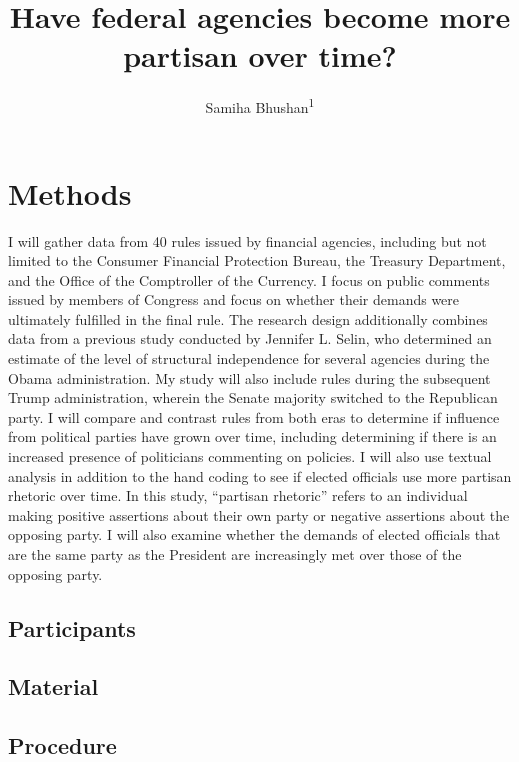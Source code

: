 \documentclass[
  english,
  man]{apa6}
\title{Have federal agencies become more partisan over time?}
\author{Samiha Bhushan\textsuperscript{1}}
\date{}
\affiliation{\vspace{0.5cm}\textsuperscript{1} University of Wisconsin-Madison}
\begin{document}
\maketitle

\hypertarget{methods}{%
\section{Methods}\label{methods}}

I will gather data from 40 rules issued by financial agencies, including but not limited
to the Consumer Financial Protection Bureau, the Treasury Department, and the Office of
the Comptroller of the Currency. I focus on public comments issued by members of
Congress and focus on whether their demands were ultimately fulfilled in the final rule.
The research design additionally combines data from a previous study conducted by
Jennifer L. Selin, who determined an estimate of the level of structural independence for
several agencies during the Obama administration. My study will also include rules during
the subsequent Trump administration, wherein the Senate majority switched to the
Republican party. I will compare and contrast rules from both eras to determine if
influence from political parties have grown over time, including determining if there is an
increased presence of politicians commenting on policies.
I will also use textual analysis in addition to the hand coding to see if elected officials
use more partisan rhetoric over time. In this study, ``partisan rhetoric'' refers to an
individual making positive assertions about their own party or negative assertions about
the opposing party. I will also examine whether the demands of elected officials that are
the same party as the President are increasingly met over those of the opposing party.

\hypertarget{participants}{%
\subsection{Participants}\label{participants}}

\hypertarget{material}{%
\subsection{Material}\label{material}}

\hypertarget{procedure}{%
\subsection{Procedure}\label{procedure}}
\end{document}
